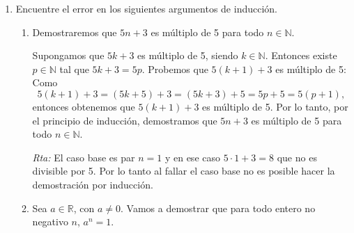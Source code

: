 \documentclass[12pt,spanish,makeidx]{amsbook}
\newcommand{\rta}{\noindent\textit{Rta: }}
\begin{document}
\begin{enumerate}
\begin{enumerate}
				\rta Para el caso base no falla pues $1 = 1^2$,  pero cuando queremos hacer el paso inductivo tenemos
				\begin{equation*}
					k+1 \overset{\text{(HI)}}{=} k^2 +1 \not=(k+1)^2.
				\end{equation*}
				
				\item  $n=n+1$. No vale en el caso base: $1 \ne 1+1$.
				\item  $3^n = 3^{n+2}$.  No vale en el caso base: $3^1 = 3 \ne 27 = 3^3$.
				\item  $3^{3n} = 3^{n+2}$.  
				
				\rta La afirmación vale en el caso base pues  $3^{3\cdot 1} = 3^{1+2}$. En el paso inductivo debemos probar que si  vale $3^{3k} = 3^{k+2}$, entonces se cumple $3^{3(k+1)} = 3^{(k+1)+3}$. Sin embargo, usando  la (HI) obtenemos:
				\begin{equation*}
				3^{3(k+1)}  = 3^{3k+3} = 3^{3k}3^3\overset{\text{(HI)}}{=} 3^{k+2}3^3 = 3^{k+5}.
				\end{equation*}
				Por otro  lado $3^{(k+1)+2} = 3^{k+3}$. Deberíamos probar entonces que $3^{k+5} = 3^{k+3}$, pero esto es falso pues dividiendo  por $3^{k+3}$ obtenemos $3^2 =1$,  lo cual es absurdo.
		\end{enumerate}
		
		\smallskip
		
		\item Encuentre el error en los siguientes argumentos de inducción.
		\begin{enumerate}
			\item  Demostraremos que $5n+3$ es múltiplo de 5 para todo $n\in \mathbb N$.
			
			Supongamos que $5k+3$ es múltiplo de 5, siendo $k\in \mathbb N$. Entonces existe
			$p\in \mathbb N$ tal que  $5k+3=5p$. Probemos que $5(k+1)+3$ es múltiplo de 5:
			Como
			$$
			5(k+1)+3=(5k+5)+3=(5k+3)+5=5p+5=5(p+1),
			$$
			entonces obtenemos que $5(k+1)+3$ es múltiplo de 5. Por lo tanto, por el principio
			de inducción, demostramos que $5n+3$ es múltiplo de 5 para todo $n\in \mathbb
			N$.
			
			\rta El caso base es par $n=1$ y en ese caso $5\cdot 1+3=8$ que no es divisible por 5. Por lo tanto al fallar el caso base no es posible hacer la demostración por inducción. 
			
			\smallskip
			
			\item Sea $a\in\mathbb R$, con $a\neq 0$. Vamos a demostrar que para todo entero no negativo $n$, $a^n=1$.
			

\end{enumerate}
\end{enumerate}
\end{document}

